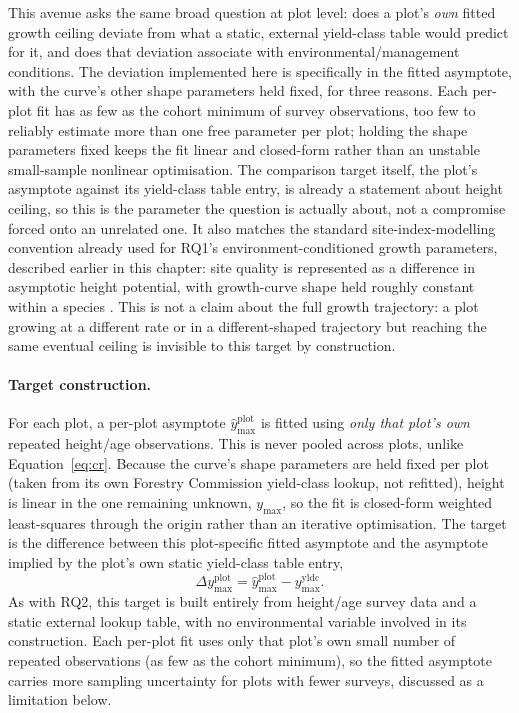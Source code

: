 \documentclass[11pt,a4paper]{report}
\begin{document}
This avenue asks the same broad question at plot level: does a plot's \emph{own} fitted growth
ceiling deviate from what a static, external yield-class table would predict for it, and does
that deviation associate with environmental/management conditions. The deviation implemented here
is specifically in the fitted asymptote, with the curve's other shape parameters held fixed, for
three reasons. Each per-plot fit has as few as the cohort minimum of survey observations, too few
to reliably estimate more than one free parameter per plot; holding the shape parameters fixed
keeps the fit linear and closed-form rather than an unstable small-sample nonlinear optimisation.
The comparison target itself, the plot's asymptote against its yield-class table entry, is already
a statement about height ceiling, so this is the parameter the question is actually about, not a
compromise forced onto an unrelated one. It also matches the standard site-index-modelling
convention already used for RQ1's environment-conditioned growth parameters, described earlier in
this chapter: site quality is represented as a difference in asymptotic height potential, with
growth-curve shape held roughly constant within a species \citep{socha2021}. This is not a claim
about the full growth trajectory: a plot growing at a different rate or in a different-shaped
trajectory but reaching the same eventual ceiling is invisible to this target by construction.

\paragraph*{Target construction.}
For each plot, a per-plot asymptote $\hat y_{\max}^{\text{plot}}$ is fitted using \emph{only that
plot's own} repeated height/age observations. This is never pooled across plots, unlike
Equation~\ref{eq:cr}. Because the curve's shape parameters are held fixed per plot (taken from
its own Forestry Commission yield-class lookup, not refitted), height is linear in the one
remaining unknown, $y_{\max}$, so the fit is closed-form weighted least-squares through the
origin rather than an iterative optimisation. The target is the difference between this
plot-specific fitted asymptote and the asymptote implied by the plot's own static yield-class
table entry,
\begin{equation}
\Delta y_{\max}^{\text{plot}} = \hat y_{\max}^{\text{plot}} - y_{\max}^{\text{yldc}}.
\label{eq:local-ymax-diff}
\end{equation}
As with RQ2, this target is built entirely from height/age survey data and a static external
lookup table, with no environmental variable involved in its construction. Each per-plot fit uses
only that plot's own small number of repeated observations (as few as the cohort minimum), so the
fitted asymptote carries more sampling uncertainty for plots with fewer surveys, discussed as a
limitation below.
\end{document}
